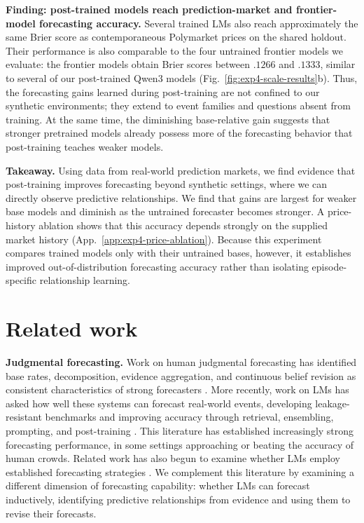 \documentclass{article}
\begin{document}
\noindent\textbf{Finding: post-trained models reach prediction-market and frontier-model forecasting accuracy.} Several trained LMs also reach approximately the same Brier score as contemporaneous Polymarket prices on the shared holdout.
Their performance is also comparable to the four untrained frontier models we evaluate: the frontier models obtain Brier scores between $.1266$ and $.1333$, similar to several of our post-trained Qwen3 models (Fig.~\ref{fig:exp4-scale-results}b).
Thus, the forecasting gains learned during post-training are not confined to our synthetic environments; they extend to event families and questions absent from training.
At the same time, the diminishing base-relative gain suggests that stronger pretrained models already possess more of the forecasting behavior that post-training teaches weaker models.

\noindent\textbf{Takeaway.}
Using data from real-world prediction markets, we find evidence that post-training improves forecasting beyond synthetic settings, where we can directly observe predictive relationships.
We find that gains are largest for weaker base models and diminish as the untrained forecaster becomes stronger.
A price-history ablation shows that this accuracy depends strongly on the supplied market history (App.~\ref{app:exp4-price-ablation}).
Because this experiment compares trained models only with their untrained bases, however, it establishes improved out-of-distribution forecasting accuracy rather than isolating episode-specific relationship learning.

\section{Related work}
\label{sec:related-work}

\noindent\textbf{Judgmental forecasting.}
Work on human judgmental forecasting has identified base rates, decomposition, evidence aggregation, and continuous belief revision as consistent characteristics of strong forecasters \citep{tetlock2005expert,mellers2014psychological,tetlock2016superforecasting}.
More recently, work on LMs has asked how well these systems can forecast real-world events, developing leakage-resistant benchmarks and improving accuracy through retrieval, ensembling, prompting, and post-training
\citep{zou2022forecasting,karger2025forecastbench,halawi2024approaching,schoenegger2024wisdom}.
This literature has established increasingly strong forecasting performance, in some settings approaching or beating the accuracy of human crowds.
Related work has also begun to examine whether LMs employ established forecasting strategies \citep{pratt2024can}.
We complement this literature by examining a different dimension of forecasting capability: whether LMs can forecast inductively, identifying predictive relationships from evidence and using them to revise their forecasts.
\end{document}
